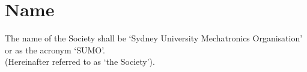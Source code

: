 \documentclass[11pt]{article}
\begin{document}


\begingroup 
\color{sumoblue}
\tableofcontents
\endgroup 

\pagebreak








\section{Name}
The name of the Society shall be ‘Sydney University Mechatronics Organisation’ or as the acronym ‘SUMO’. \\ (Hereinafter referred to as ‘the Society’).
\end{document}
